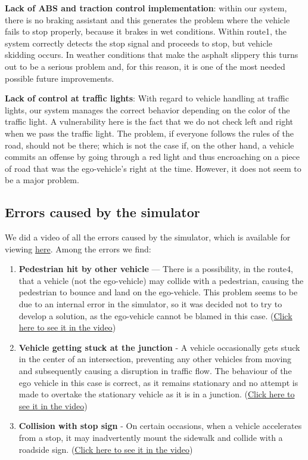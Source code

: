 \documentclass{article}
\begin{document}
\textbf{Lack of ABS and traction control implementation}\label{ABS}: within our system, there is no braking assistant and this generates the
problem where the vehicle fails to stop properly, because it brakes in wet conditions.
Within route1, the system correctly detects the stop signal and proceeds to stop, but vehicle skidding occurs.
In weather conditions that make the asphalt slippery this turns out to be a serious problem and, for this reason, it is one
of the most needed possible future improvements.\newline

\textbf{Lack of control at traffic lights}:
With regard to vehicle handling at traffic lights, our system manages the correct behavior depending on the color of the
traffic light. A vulnerability here is the fact that we do not check left and right when we pass the traffic light. The problem,
if everyone follows the rules of the road, should not be there; which is not the case if, on the other hand, a vehicle commits
an offense by going through a red light and thus encroaching on a piece of road that was the ego-vehicle's right at the time.
However, it does not seem to be a major problem.

\subsection{Errors caused by the simulator}\label{simErr}
We did a video of all the errors caused by the simulator, which is available for viewing \href{https://youtu.be/0O9b3UihDAw}{here}.
Among the errors we find:
\begin{enumerate}
    \item \textbf{Pedestrian hit by other vehicle} — There is a possibility, in the route4, that a vehicle (not the ego-vehicle)
    may collide with a pedestrian, causing the pedestrian to bounce and land on the ego-vehicle. This problem seems to be due to
    an internal error in the simulator, so it was decided not to try to develop a solution, as the ego-vehicle cannot be blamed
    in this case. (\href{https://youtu.be/0O9b3UihDAw?t=11}{Click here to see it in the video})
    \item \textbf{Vehicle getting stuck at the junction} - A vehicle occasionally gets stuck in the center of an intersection,
    preventing any other vehicles from moving and subsequently causing a disruption in traffic flow.
    The behaviour of the ego vehicle in this case is correct, as it remains stationary and no attempt is made to overtake the
    stationary vehicle as it is in a junction. (\href{https://youtu.be/0O9b3UihDAw?t=19}{Click here to see it in the video})
    \item \textbf{Collision with stop sign} - On certain occasions, when a vehicle accelerates from a stop, it may inadvertently
    mount the sidewalk and collide with a roadside sign. (\href{https://youtu.be/0O9b3UihDAw?t=40}{Click here to see it in the video})
\end{enumerate}
\end{document}
